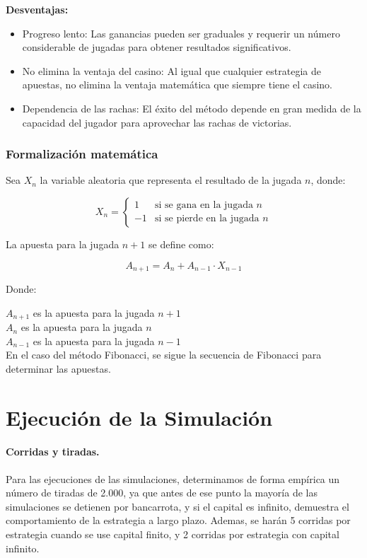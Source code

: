 \documentclass{article}
\begin{document}
\textbf{Desventajas:}

\begin{itemize}
    \item Progreso lento: Las ganancias pueden ser graduales y requerir un número considerable de jugadas para obtener resultados significativos.
    \item No elimina la ventaja del casino: Al igual que cualquier estrategia de apuestas, no elimina la ventaja matemática que siempre tiene el casino.
    \item Dependencia de las rachas: El éxito del método depende en gran medida de la capacidad del jugador para aprovechar las rachas de victorias.
\end{itemize}

\subsubsection{Formalización matemática}

Sea $X_n$ la variable aleatoria que representa el resultado de la jugada $n$, donde:

\[ X_n = \begin{cases} 
1 & \text{si se gana en la jugada } n \\
-1 & \text{si se pierde en la jugada } n 
\end{cases} \]

La apuesta para la jugada $n+1$ se define como:

\[ A_{n+1} = A_n + A_{n-1} \cdot X_{n-1} \]

Donde:

$A_{n+1}$ es la apuesta para la jugada $n+1$ \\
$A_n$ es la apuesta para la jugada $n$ \\
$A_{n-1}$ es la apuesta para la jugada $n-1$ \\
En el caso del método Fibonacci, se sigue la secuencia de Fibonacci para determinar las apuestas.

\section{Ejecución de la Simulación}
\paragraph{Corridas y tiradas.} Para las ejecuciones de las simulaciones, determinamos de forma empírica un número de tiradas de 2.000, ya que antes de ese punto la mayoría de las simulaciones se detienen por bancarrota, y si el capital es infinito, demuestra el comportamiento de la estrategia a largo plazo. Ademas, se harán 5 corridas por estrategia cuando se use capital finito, y 2 corridas por estrategia con capital infinito.
\end{document}

